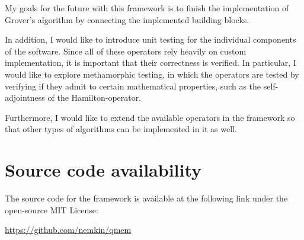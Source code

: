 My goals for the future with this framework is to finish the implementation of Grover's algorithm by connecting the implemented building blocks.

In addition, I would like to introduce unit testing for the individual components of the software. Since all of these operators rely heavily on custom implementation, it is important that their correctness is verified. In particular, I would like to explore methamorphic testing, in which the operators are tested by verifying if they admit to certain mathematical properties, such as the self-adjointness of the Hamilton-operator.

Furthermore, I would like to extend the available operators in the framework so that other types of algorithms can be implemented in it as well.

\section{Source code availability}

The source code for the framework is available at the following link under the open-source MIT License:

\href{https://github.com/nemkin/qmem}{https://github.com/nemkin/qmem}

